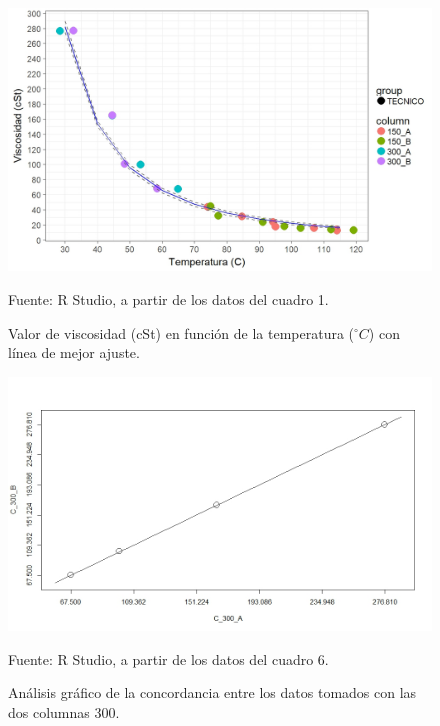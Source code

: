 \documentclass[12, letterpaper]{article}
\begin{document}
\begin{landscape}
\begin{figure}[H]
	\centering
	\includegraphics[width=1\columnwidth]{figura_4.png}
	\caption{Valor de viscosidad (cSt) en función de la temperatura ($^{\circ}C$) con línea de mejor ajuste.}
	Fuente: R Studio, a partir de los datos del cuadro 1.
    \label{figura4}
\end{figure}

\begin{figure}[H]
	\centering
	\includegraphics[width=1\columnwidth]{figura_5.png}
	\caption{Análisis gráfico de la concordancia entre los datos tomados con las dos columnas 300.}
	Fuente: R Studio, a partir de los datos del cuadro 6.
    \label{figura5}
\end{figure}


\end{landscape}
\end{document}
